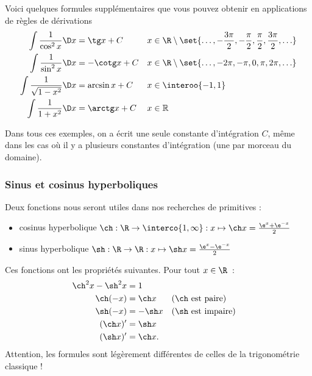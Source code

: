\begin{frame}
  Voici quelques formules supplémentaires que vous pouvez obtenir en applications de règles de dérivations \pause{}
  \begin{align*}
    \int \frac{1}{\cos^2 x} \D x    & = \tg x + C               &  & x \in \R \setminus \set{\ldots, -\frac{3\pi}{2}, -\frac{\pi}{2},\frac{\pi}{2}, \frac{3\pi}{2}, \ldots} \\
    \int \frac{1}{\sin^2 x} \D x    & = - \cotg x + C           &  & x \in \R \setminus \set{\ldots, -2\pi, -\pi, 0, \pi, 2\pi, \ldots}                                     \\
    \int \frac{1}{\sqrt{1-x^2}}\D x & = \arcsin x + C           &  & x \in \interoo{-1,1}                                                                                   \\
    \int \frac{1}{1+x^2} \D x       & = \arctg x + C            &  & x \in \mathbb{R}                                                                                       \\
  \end{align*}
  \begin{remark*}\pause{}
    Dans tous ces exemples, on a écrit une seule constante d'intégration $C$, même dans les cas où il y a plusieurs constantes d'intégration (une par \og morceau\fg{} du domaine).
  \end{remark*}
\end{frame}
\subsubsection{Sinus et cosinus hyperboliques}
\begin{frame}
  Deux fonctions nous seront utiles dans nos recherches de primitives :\pause{}
  \begin{itemize}
  \item cosinus hyperbolique \(\ch : \R \to \interco{1,\infty} : x \mapsto \ch x = \frac{\e^x+\e^{-x}}{2}\)\pause{}
  \item sinus hyperbolique \(\sh : \R \to \R : x \mapsto \sh x = \frac{\e^x-\e^{-x}}{2}\)
  \end{itemize}\pause{}
  Ces fonctions ont les propriétés suivantes. Pour tout $x \in \R$~:
  \begin{align*}
    \ch^2 x - \sh^2 x &= 1\\
    \ch(-x) &= \ch x && (\ch \textrm{ est paire})\\
    \sh(-x) &= - \sh x && (\sh \textrm{ est impaire})\\
    (\ch x)' &= \sh x\\
    (\sh x)' &= \ch x.\\
  \end{align*}\pause{}
  Attention, les formules sont légèrement différentes de celles de la trigonométrie classique !
\end{frame}

